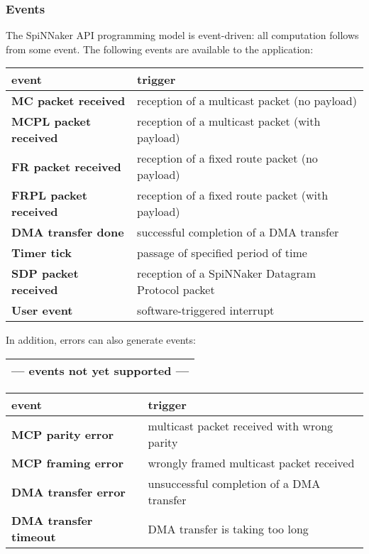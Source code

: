 \documentclass[11pt,a4paper,twoside]{article}
\begin{document}
\subsubsection{Events}

The SpiNNaker API programming model is event-driven: all computation
follows from some event. The following events are available to the
application:

\begin{center}
\renewcommand{\arraystretch}{1.2}
\begin{tabularx}{\textwidth}{| p{\fcw} X |}
\hline
\textbf{event} & \textbf{trigger} \\%
\hline
\hline
\textbf{MC packet received} & reception of a multicast packet (no payload) \\%
\textbf{MCPL packet received} & reception of a multicast packet (with payload) \\%
\textbf{FR packet received} & reception of a fixed route packet (no payload) \\%
\textbf{FRPL packet received} & reception of a fixed route packet (with payload) \\%
\textbf{DMA transfer done} & successful completion of a DMA transfer \\%
\textbf{Timer tick} & passage of specified period of time \\%
\textbf{SDP packet received} & reception of a SpiNNaker Datagram Protocol packet \\%
\textbf{User event} & software-triggered interrupt \\%
\hline
\end{tabularx}
\end{center}


In addition, errors can also generate events:

\begin{center}
\renewcommand{\arraystretch}{1.2}
\begin{tabularx}{\textwidth}{| X |}
\hline
\rowcolor{red!25}
\textbf{--- events not yet supported ---} \\%
\hline
\end{tabularx}
\begin{tabularx}{\textwidth}{| p{\fcw} X |}
\hline
\textbf{event} & \textbf{trigger} \\%
\hline
\hline
\textbf{MCP parity error} & multicast packet received with wrong parity \\%
\textbf{MCP framing error} & wrongly framed multicast packet received \\%
\textbf{DMA transfer error} & unsuccessful completion of a DMA transfer \\%
\textbf{DMA transfer timeout} & DMA transfer is taking too long \\%
\hline
\end{tabularx}
\end{center}
\end{document}
